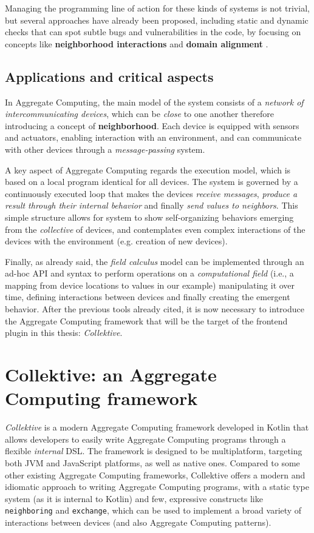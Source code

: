 \documentclass[12pt,a4paper,openright,twoside]{book}
\begin{document}
Managing the programming line of action for these kinds of systems is not
trivial, but several approaches have already been proposed, including static and
dynamic checks that can spot subtle bugs and vulnerabilities in the code, by
focusing on concepts like \textbf{neighborhood interactions} and \textbf{domain
alignment} \cite{DBLP:conf/saso/AudritoDVC16}.

\subsection{Applications and critical aspects}

In Aggregate Computing, the main model of the system consists of a \emph{network of 
intercommunicating devices}, which can be \emph{close} to one another therefore 
introducing a concept of \textbf{neighborhood}. 
%
Each device is equipped with sensors and actuators, enabling interaction with an
environment, and can communicate with other devices through a
\emph{message-passing} system. 

A key aspect of Aggregate Computing regards the execution model, which is based
on a local program identical for all devices. The system is governed by a
continuously executed loop that makes the devices \emph{receive messages},
\emph{produce a result through their internal behavior} and finally \emph{send
values to neighbors}. 
%
This simple structure allows for system to show self-organizing behaviors
emerging from the \emph{collective} of devices, and contemplates even complex
interactions of the devices with the environment (e.g. creation of new devices).

Finally, as already said, the \emph{field calculus} model can be implemented
through an ad-hoc API and syntax to perform operations on a \emph{computational
field} (i.e., a mapping from device locations to values in our example)
manipulating it over time, defining interactions between devices and finally
creating the emergent behavior.
%
After the previous tools already cited, it is now necessary to
introduce the Aggregate Computing framework that will be the target of the
frontend plugin in this thesis: \emph{Collektive}.

\section{Collektive: an Aggregate Computing framework}

\emph{Collektive} is a modern Aggregate Computing framework developed in Kotlin 
that allows developers to easily write Aggregate Computing programs through a 
flexible \emph{internal} DSL. The framework is designed to be multiplatform,
targeting both JVM and JavaScript platforms, as well as native ones. 
%
Compared to some other existing Aggregate Computing frameworks, Collektive
offers a modern and idiomatic approach to writing Aggregate Computing programs,
with a static type system (as it is internal to Kotlin) and few, expressive
constructs like \lstinline{neighboring} and \lstinline{exchange}, which can be
used to implement a broad variety of interactions between devices (and also
Aggregate Computing patterns).
\end{document}
